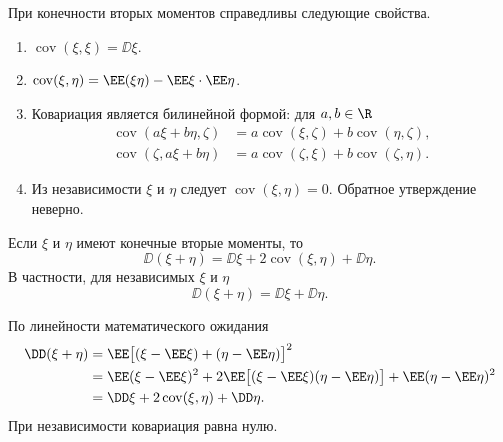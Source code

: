 \begin{theorem}
    При конечности вторых моментов справедливы следующие свойства.
    \begin{enumerate}
        \item $\operatorname{cov}(\xi,\xi)=\DD\xi$.
        \item $\operatorname{cov}(\xi,\eta)=\EE(\xi\eta)-\EE\xi\cdot\EE\eta$.
        \item Ковариация является билинейной формой: для $a,b\in\R$
        \[
            \begin{aligned}
                \operatorname{cov}(a\xi+b\eta,\zeta)
                &=a\operatorname{cov}(\xi,\zeta)+b\operatorname{cov}(\eta,\zeta),\\
                \operatorname{cov}(\zeta,a\xi+b\eta)
                &=a\operatorname{cov}(\zeta,\xi)+b\operatorname{cov}(\zeta,\eta).
            \end{aligned}
        \]
        \item Из независимости $\xi$ и $\eta$ следует
        $\operatorname{cov}(\xi,\eta)=0$. Обратное утверждение неверно.
    \end{enumerate}
\end{theorem}
\begin{theorem}
    Если $\xi$ и $\eta$ имеют конечные вторые моменты, то
    \[
        \DD(\xi+\eta)=\DD\xi+2\operatorname{cov}(\xi,\eta)+\DD\eta.
    \]
    В частности, для независимых $\xi$ и $\eta$
    \[
        \DD(\xi+\eta)=\DD\xi+\DD\eta.
    \]
\end{theorem}

\begin{Proof}
    По линейности математического ожидания
    \[
        \begin{aligned}
            \DD(\xi+\eta)
            &=\EE\bigl[(\xi-\EE\xi)+(\eta-\EE\eta)\bigr]^2\\
            &=\EE(\xi-\EE\xi)^2
              +2\EE\bigl[(\xi-\EE\xi)(\eta-\EE\eta)\bigr]
              +\EE(\eta-\EE\eta)^2\\
            &=\DD\xi+2\operatorname{cov}(\xi,\eta)+\DD\eta.
        \end{aligned}
    \]
    При независимости ковариация равна нулю.
\end{Proof}
\endgroup
